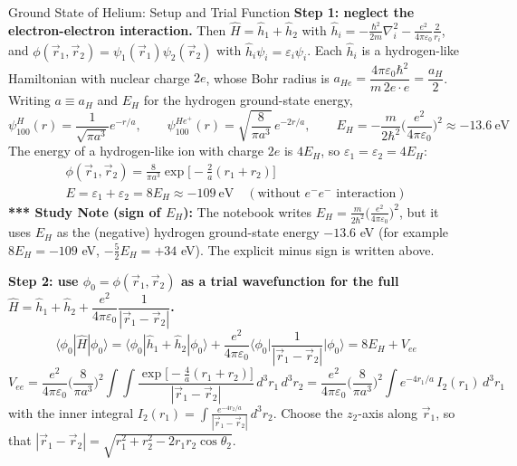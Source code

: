 \documentclass[11pt,a4paper]{article}
\begin{document}
\begin{prob}{Ground State of Helium: Setup and Trial Function}
\textbf{Step 1: neglect the electron-electron interaction.} Then $\hat H = \hat h_1+\hat h_2$ with $\hat h_i = -\frac{\hbar^2}{2m}\nabla_i^2 - \frac{e^2}{4\pi\varepsilon_0}\frac2{r_i}$, and $\phi(\vec r_1,\vec r_2) = \psi_1(\vec r_1)\psi_2(\vec r_2)$ with $\hat h_i\psi_i = \varepsilon_i\psi_i$. Each $\hat h_i$ is a hydrogen-like Hamiltonian with nuclear charge $2e$, whose Bohr radius is $a_{He} = \dfrac{4\pi\varepsilon_0\hbar^2}{m\,2e\cdot e} = \dfrac{a_H}2$. Writing $a\equiv a_H$ and $E_H$ for the hydrogen ground-state energy,
\[
\psi^{H}_{100}(r) = \frac1{\sqrt{\pi a^3}}e^{-r/a}, \qquad \psi^{He^+}_{100}(r) = \sqrt{\frac{8}{\pi a^3}}\,e^{-2r/a}, \qquad E_H = -\frac{m}{2\hbar^2}\Big(\frac{e^2}{4\pi\varepsilon_0}\Big)^2\approx-13.6\ \text{eV}
\]
The energy of a hydrogen-like ion with charge $2e$ is $4E_H$, so $\varepsilon_1=\varepsilon_2=4E_H$:
\begin{gather*}
\phi(\vec r_1,\vec r_2) = \frac{8}{\pi a^3}\exp\Big[-\frac2a(r_1+r_2)\Big]\\
E = \varepsilon_1+\varepsilon_2 = 8E_H\approx-109\ \text{eV}\quad(\text{without } e^-e^-\text{ interaction})
\end{gather*}
\textbf{*** Study Note (sign of $E_H$):} The notebook writes $E_H=\frac{m}{2\hbar^2}\big(\frac{e^2}{4\pi\varepsilon_0}\big)^2$, but it uses $E_H$ as the (negative) hydrogen ground-state energy $-13.6$ eV (for example $8E_H=-109$ eV, $-\frac52E_H=+34$ eV). The explicit minus sign is written above.

\textbf{Step 2: use $\phi_0=\phi(\vec r_1,\vec r_2)$ as a trial wavefunction for the full $\hat H = \hat h_1+\hat h_2+\dfrac{e^2}{4\pi\varepsilon_0}\dfrac1{|\vec r_1-\vec r_2|}$.}
\[
\langle\phi_0|\hat H|\phi_0\rangle = \langle\phi_0|\hat h_1+\hat h_2|\phi_0\rangle + \frac{e^2}{4\pi\varepsilon_0}\Big\langle\phi_0\Big|\frac1{|\vec r_1-\vec r_2|}\Big|\phi_0\Big\rangle = 8E_H + V_{ee}
\]
\[
V_{ee} = \frac{e^2}{4\pi\varepsilon_0}\Big(\frac{8}{\pi a^3}\Big)^2\int\!\!\int\frac{\exp\!\big[-\frac4a(r_1+r_2)\big]}{|\vec r_1-\vec r_2|}\,d^3r_1\,d^3r_2
= \frac{e^2}{4\pi\varepsilon_0}\Big(\frac{8}{\pi a^3}\Big)^2\int e^{-4r_1/a}\,I_2(r_1)\,d^3r_1
\]
with the inner integral $I_2(r_1) = \displaystyle\int\frac{e^{-4r_2/a}}{|\vec r_1-\vec r_2|}\,d^3r_2$. Choose the $z_2$-axis along $\vec r_1$, so that $|\vec r_1-\vec r_2| = \sqrt{r_1^2+r_2^2-2r_1r_2\cos\theta_2}$.
\begin{center}
\end{center}
\end{prob}
\end{document}
